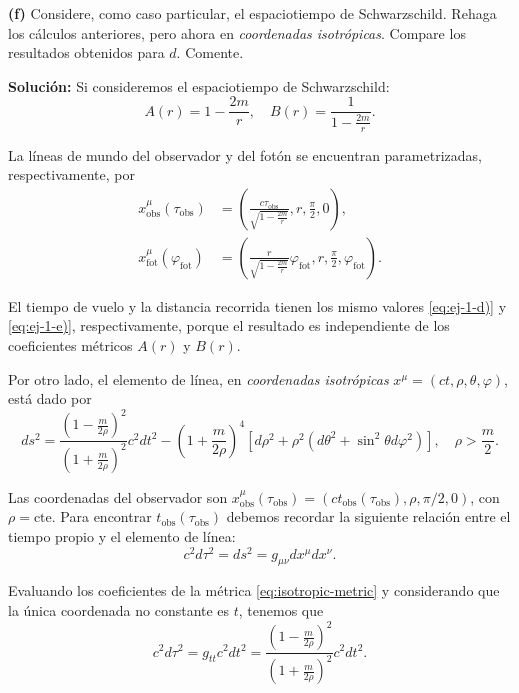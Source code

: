 \documentclass[letterpaper,11pt]{article}
\begin{document}
\textbf{(f)} Considere, como caso particular, el espaciotiempo de Schwarzschild. Rehaga los cálculos anteriores, pero ahora en \textit{coordenadas isotrópicas}. Compare los resultados obtenidos para $d$. Comente.

\textbf{Solución:} Si consideremos el espaciotiempo de Schwarzschild:
\begin{equation}
A(r) = 1 - \frac{2m}{r}, \quad B(r) = \frac{1}{1 - \frac{2m}{r}}.
\end{equation}

La líneas de mundo del observador y del fotón se encuentran parametrizadas, respectivamente, por
\begin{align}
x_{\text{obs}}^{\mu}(\tau_\text{obs}) &= \left(\frac{c\tau_\text{obs}}{\sqrt{1 - \frac{2m}{r}}},r,\frac{\pi}{2},0 \right), \\
x_{\text{fot}}^{\mu}(\varphi_{\text{fot}}) &= \left(\frac{r}{\sqrt{1 - \frac{2m}{r}}} \varphi_{\text{fot}},r,\frac{\pi}{2},\varphi_{\text{fot}} \right).
\end{align}

El tiempo de vuelo y la distancia recorrida tienen los mismo valores \eqref{eq:ej-1-d)} y \eqref{eq:ej-1-e)}, respectivamente, porque el resultado es independiente de los coeficientes métricos $A(r)$ y $B(r)$.

Por otro lado, el elemento de línea, en \textit{coordenadas isotrópicas} $x^{\mu} = (ct,\rho,\theta,\varphi)$, está dado por
\begin{equation}
ds^2 = \frac{\left(1 - \frac{m}{2\rho} \right)^2}{\left(1 + \frac{m}{2\rho} \right)^2} c^2 dt^2 - \left( 1 + \frac{m}{2\rho}\right)^4 [d\rho^2 + \rho^2 (d\theta^2 + \sin^2\theta d\varphi^2)], \quad \rho > \frac{m}{2}. \label{eq:isotropic-metric}
\end{equation}

Las coordenadas del observador son $x_{\text{obs}}^{\mu}(\tau_{\text{obs}}) = (c t_{\text{obs}}(\tau_{\text{obs}}),\rho,\pi/2,0)$, con $\rho = \text{cte}$. Para encontrar $t_{\text{obs}}(\tau_{\text{obs}})$ debemos recordar la siguiente relación entre el tiempo propio y el elemento de línea:
\begin{equation}
c^2 d\tau^2 = ds^2 = g_{\mu\nu} dx^{\mu} dx^{\nu}.
\end{equation}

Evaluando los coeficientes de la métrica \eqref{eq:isotropic-metric} y considerando que la única coordenada no constante es $t$, tenemos que
\begin{equation}
c^2d\tau^2 = g_{tt} c^2dt^2 = \frac{\left(1 - \frac{m}{2\rho} \right)^2}{\left(1 + \frac{m}{2\rho} \right)^2} c^2 dt^2.
\end{equation} 
\end{document}
